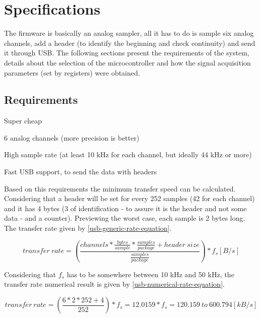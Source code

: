 \section{Specifications}
\label{firmware-specifications}

The firmware is basically an analog sampler, all it has to do is sample six analog
channels, add a header (to identify the beginning and check continuity) and send it
through USB. The following sections present the requirements of the system, details
about the selection of the microcontroller and how the signal acquisition parameters
(set by registers) were obtained.

\subsection{Requirements}
\begin{itemlist}
  \item Super cheap
  \item 6 analog channels (more precision is better)
  \item High sample rate (at least 10 kHz for each channel, but ideally 44 kHz or more)
  \item Fast USB support, to send the data with headers
\end{itemlist}
Based on this requirements the minimum transfer speed can be calculated. Considering
that a header will be set for every 252 samples (42 for each channel) and
it has 4 bytes (3 of identification - to assure it is the header and not some
data - and a counter). Previewing the worst case, each sample is 2 bytes long.
The transfer rate given by \autoref{usb-generic-rate-equation}.

\begin{equation}
  \label{usb-generic-rate-equation}
  transfer\ rate = \left( \frac{channels * \frac{bytes}{sample} * \frac{samples}{package} + header\ size}{\frac{samples}{package}}  \right ) * f_{s} [B/s]
\end{equation}

Considering that $f_{s}$ has to be somewhere between 10 kHz and 50 kHz, the transfer
rate numerical result is given by \autoref{usb-numerical-rate-equation}.

\begin{equation}
  \label{usb-numerical-rate-equation}
  transfer\ rate = \left( \frac{6 * 2 * 252 + 4}{252}  \right ) * f_{s} = 12.0159 * f_{s} = 120.159\ to\ 600.794 [kB/s]
\end{equation}

